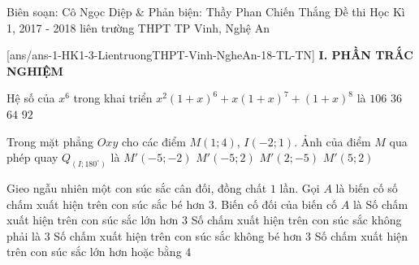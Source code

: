 	\begin{name}
{Biên soạn: Cô Ngọc Diệp \& Phản biện: Thầy Phan Chiến Thắng}
		{Đề thi Học Kì 1, 2017 - 2018 liên trường THPT TP Vinh, Nghệ An}
	\end{name}
	\setcounter{ex}{0}\setcounter{bt}{0}
	[ans/ans-1-HK1-3-LientruongTHPT-Vinh-NgheAn-18-TL-TN]
\noindent\textbf{I. PHẦN TRẮC NGHIỆM}
\begin{ex}%
	Hệ số của $x^6$ trong khai triển $x^2 (1+x)^6 + x(1+x)^7 + (1+x)^8$ là
	\choice
	{$106$}
	{$36$}
	{\True $64$}
	{$92$}
\end{ex}

\begin{ex}%
	Trong mặt phẳng $Oxy$ cho các điểm $M(1;4)$, $I(-2;1)$. Ảnh của điểm $M$ qua phép quay $Q_{(I;180^\circ)}$ là
	\choice
	{\True $M'(-5;-2)$}
	{$M'(-5;2)$}
	{$M'(2;-5)$}
	{$M'(5;2)$}
\end{ex}

\begin{ex}%
	Gieo ngẫu nhiên một con súc sắc cân đối, đồng chất $1$ lần. Gọi $A$ là biến cố số chấm xuất hiện trên con
	súc sắc bé hơn $3$. Biến cố đối của biến cố $A$ là
	\choice
	{Số chấm xuất hiện trên con súc sắc lớn hơn $3$}
	{Số chấm xuất hiện trên con súc sắc không phải là $3$}
	{\True Số chấm xuất hiện trên con súc sắc không bé hơn $3$}
	{Số chấm xuất hiện trên con súc sắc lớn hơn hoặc bằng $4$}
\end{ex}

